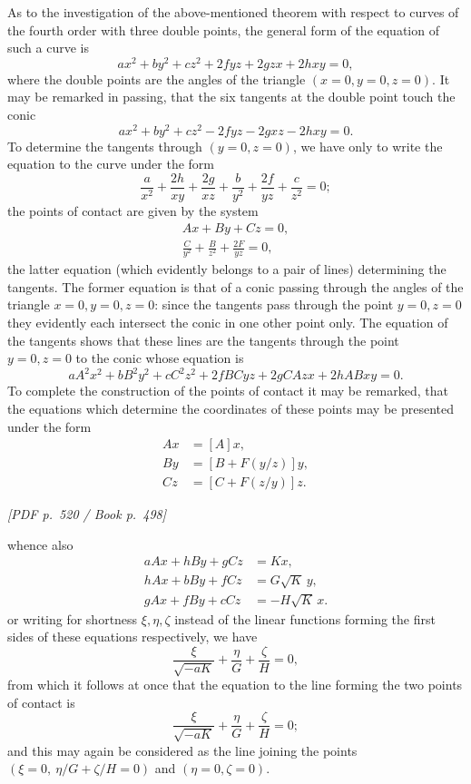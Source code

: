 \documentclass[11pt]{article}
\newcommand{\Page}[2]{\bigskip\noindent\textit{[PDF p.~#1 / Book p.~#2]}\par\smallskip}
\begin{document}
As to the investigation of the above-mentioned theorem with respect to curves of the
fourth order with three double points, the general form of the equation of such a
curve is
\[
        ax^2+b y^2+c z^2+2fyz+2gzx+2hxy=0,
\]
where the double points are the angles of the triangle $(x=0,y=0,z=0)$. It may be
remarked in passing, that the six tangents at the double point touch the conic
\[
        ax^2+by^2+cz^2-2fyz-2gxz-2hxy=0.
\]
To determine the tangents through $(y=0,z=0)$, we have only to write the equation
to the curve under the form
\[
        \frac{a}{x^2}+\frac{2h}{xy}+\frac{2g}{xz}
        +\frac{b}{y^2}+\frac{2f}{yz}+\frac{c}{z^2}=0;
\]
the points of contact are given by the system
\[
\begin{gathered}
        Ax+By+Cz=0,\\
        \frac{C}{y^2}+\frac{B}{z^2}+\frac{2F}{yz}=0,
\end{gathered}
\]
the latter equation (which evidently belongs to a pair of lines) determining the
tangents. The former equation is that of a conic passing through the angles of the
triangle $x=0,y=0,z=0$: since the tangents pass through the point $y=0,z=0$ they
evidently each intersect the conic in one other point only. The equation of the
tangents shows that these lines are the tangents through the point $y=0,z=0$ to the
conic whose equation is
\[
        aA^2x^2+bB^2y^2+cC^2z^2+2fBCyz+2gCAzx+2hABxy=0.
\]
To complete the construction of the points of contact it may be remarked, that the
equations which determine the coordinates of these points may be presented under the
form
\[
\begin{aligned}
Ax&=[A]x,\\
By&=[B+F(y/z)]y,\\
Cz&=[C+F(z/y)]z.
\end{aligned}
\]

\Page{520}{498}

\noindent whence also
\[
\begin{aligned}
aAx+hBy+gCz&=Kx,\\
hAx+bBy+fCz&=G\sqrt{K}\,y,\\
gAx+fBy+cCz&=-H\sqrt{K}\,x.
\end{aligned}
\]
or writing for shortness $\xi,\eta,\zeta$ instead of the linear functions forming
the first sides of these equations respectively, we have
\[
        \frac{\xi}{\sqrt{-aK}}+\frac{\eta}{G}+\frac{\zeta}{H}=0,
\]
from which it follows at once that the equation to the line forming the two points
of contact is
\[
        \frac{\xi}{\sqrt{-aK}}+\frac{\eta}{G}+\frac{\zeta}{H}=0;
\]
and this may again be considered as the line joining the points
$(\xi=0,\ \eta/G+\zeta/H=0)$ and $(\eta=0,\zeta=0)$.
\end{document}
